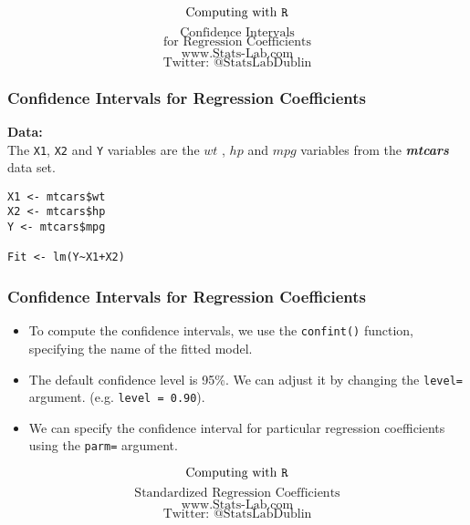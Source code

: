 \documentclass{beamer}
\begin{document}
\begin{frame}
\Huge
\[\mbox{Computing with \texttt{R}}\]
\huge
\[\mbox{Confidence Intervals}\]
\[\mbox{for Regression Coefficients}\]
\bigskip
\LARGE
\[\mbox{www.Stats-Lab.com}\]
\[\mbox{Twitter: @StatsLabDublin}\]
\end{frame}
\begin{frame}[fragile]
\frametitle{Confidence Intervals for Regression Coefficients}
\Large
\vspace{-1cm}
\textbf{Data:} \\
The \texttt{X1}, \texttt{X2} and \texttt{Y} variables are the $wt$ , $hp$ and $mpg$ variables from the \textit{\textbf{\textit{mtcars}}} data set.

\begin{framed}
\begin{verbatim}
X1 <- mtcars$wt
X2 <- mtcars$hp
Y <- mtcars$mpg

Fit <- lm(Y~X1+X2)
\end{verbatim}
\end{framed}
\end{frame}
\begin{frame}
\frametitle{Confidence Intervals for Regression Coefficients}
\Large
\vspace{-1cm}
\begin{itemize}
\item To compute the confidence intervals, we use the \texttt{confint()} function, specifying the name of the fitted model. \vspace{0.2cm}
\item The default confidence level is 95\%. We can adjust it by changing the \texttt{level=} argument. (e.g. \texttt{level = 0.90}).
\item We can specify the confidence interval for particular regression coefficients using the \texttt{parm=} argument.
\end{itemize}
\end{frame}
\begin{frame}
\Huge
\[\mbox{Computing with \texttt{R}}\]
\LARGE
\[\mbox{Standardized Regression Coefficients}\]
\bigskip
\LARGE
\[\mbox{www.Stats-Lab.com}\]
\[\mbox{Twitter: @StatsLabDublin}\]
\end{frame}
\end{document}
